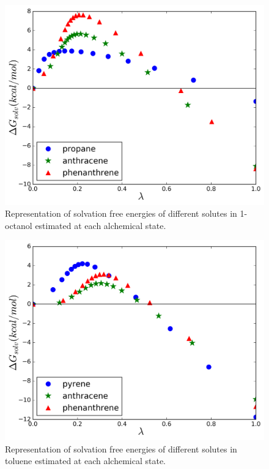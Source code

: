 \documentclass[final,12p,times,twocolumn]{elsarticle}
\begin{document}
	\begin{figure}[h]
		\centering
		\includegraphics[width=1.0\linewidth]{Figures/octart}
		\caption{Representation of solvation free energies of different solutes in 1-octanol estimated at each alchemical state.}
		\label{fig:oct}
	\end{figure}
	
	\begin{figure}
		\centering
		\includegraphics[width=1.0\linewidth]{Figures/tolart}
		\caption{Representation of solvation free energies of different solutes in toluene estimated at each alchemical state. }
		\label{fig:tol}
	\end{figure}
	
\end{document}
